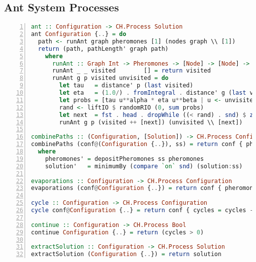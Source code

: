 \begin{landscape}
\section{Ant System Processes}
\label{app:ant_system_processes}

\begin{lstlisting}[language=Haskell,frame=tb,numbers=left,caption=Implementation of basic processes for the ant system., basicstyle=\footnotesize\ttfamily]
ant :: Configuration -> CH.Process Solution
ant Configuration {..} = do
  path <- runAnt graph pheromones [1] (nodes graph \\ [1])
  return (path, pathLength' graph path)
    where
      runAnt :: Graph Int -> Pheromones -> [Node] -> [Node] -> CH.Process Path
      runAnt _ _ visited        [] = return visited
      runAnt g p visited unvisited = do
        let tau   = distance' p (last visited)
        let eta   = (1.0/) . fromIntegral . distance' g (last visited)
        let probs = [tau u**alpha * eta u**beta | u <- unvisited]
        rand <- liftIO $ randomRIO (0, sum probs)
        let next  = fst . head . dropWhile ((< rand) . snd) $ zip unvisited (scanl1 (+) probs)
        runAnt g p (visited ++ [next]) (unvisited \\ [next])

combinePaths :: (Configuration, [Solution]) -> CH.Process Configuration
combinePaths (conf@(Configuration {..}), ss) = return conf { pheromones = pheromones', solution = solution' }
  where
    pheromones' = depositPheromones ss pheromones
    solution'   = minimumBy (compare `on` snd) (solution:ss)

evaporations :: Configuration -> CH.Process Configuration
evaporations (conf@Configuration {..}) = return conf { pheromones = evaporation rho pheromones }

cycle :: Configuration -> CH.Process Configuration
cycle conf@Configuration {..} = return conf { cycles = cycles - 1 }

continue :: Configuration -> CH.Process Bool
continue Configuration {..} = return (cycles > 0)

extractSolution :: Configuration -> CH.Process Solution
extractSolution (Configuration {..}) = return solution
\end{lstlisting}

\end{landscape}